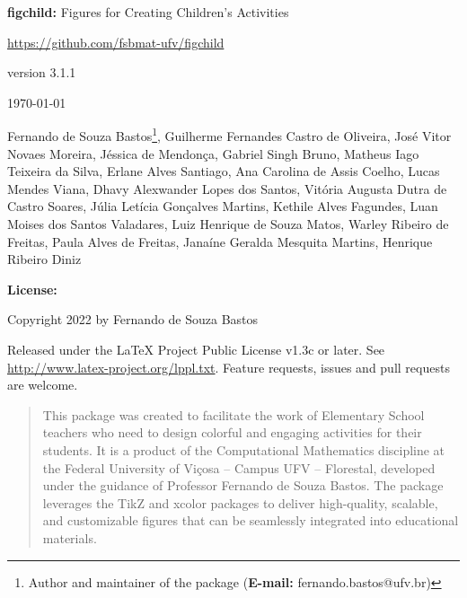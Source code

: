 \documentclass[x11names]{article}
\begin{document}
	
	
	
	\thispagestyle{empty}
	
	\begin{center}
		
		\textbf{figchild:} Figures for Creating Children's Activities
		
		\vspace{0.5cm}
		
		\url{https://github.com/fsbmat-ufv/figchild}
		
		\vspace{0.5cm}
		
		version 3.1.1
		
		\vspace{0.5cm}
		
		\today
		
	\end{center}
	
	\vspace{2cm}
	
	
	
	Fernando de Souza Bastos\footnote{Author and maintainer of the package (\textbf{E-mail:} fernando.bastos@ufv.br)}, 
	Guilherme Fernandes Castro de Oliveira, 
	José Vitor Novaes Moreira,
	Jéssica de Mendonça,
	Gabriel Singh Bruno,
	Matheus Iago Teixeira da Silva,
	Erlane Alves Santiago,
	Ana Carolina de Assis Coelho,
	Lucas Mendes Viana,
	Dhavy Alexwander Lopes dos Santos,
	Vitória Augusta Dutra de Castro Soares,
	Júlia Letícia Gonçalves Martins,
	Kethile Alves Fagundes,
	Luan Moises dos Santos Valadares,
	Luiz Henrique de Souza Matos,
	Warley Ribeiro de Freitas,
	Paula Alves de Freitas,
	Janaíne Geralda Mesquita Martins,
	Henrique Ribeiro Diniz
	
	\vspace{3cm}
	
	\noindent \textbf{License:}
	
	\vspace{1cm}
	
	\noindent Copyright 2022 by Fernando de Souza Bastos
	
	\vspace{1cm}
	
	\noindent Released under the LaTeX Project Public License v1.3c or later. See \url{http://www.latex-project.org/lppl.txt}. Feature requests, issues and pull requests are welcome.
	
	\newpage
	
	\begin{abstract}
		This package was created to facilitate the work of Elementary School teachers who need to design colorful and engaging activities for their students. It is a product of the Computational Mathematics discipline at the Federal University of Viçosa – Campus UFV – Florestal, developed under the guidance of Professor Fernando de Souza Bastos. The package leverages the TikZ and xcolor packages to deliver high-quality, scalable, and customizable figures that can be seamlessly integrated into educational materials.
		
	\end{abstract}
	
\end{document}
